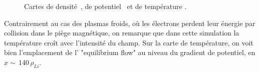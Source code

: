 \begin{refsection}
	\begin{figure}[!htbp]
    \centering
    \caption{Cartes de densité~, de
    potentiel~ et de température
   .}
    \label{2-CartesWithTeFiltre}
	\end{figure}
	
Contrairement au cas des plasmas froids, où les électrons perdent leur énergie
par collision dans le piège magnétique, on
remarque que dans cette simulation la température croît avec
l'intensité du champ. Sur la carte de température, on voit bien l'emplacement de
l' "equilibrium flow" au niveau du gradient de potentiel, en
$x\sim\,$140$\,\rho_{Li}$.
	

\end{refsection}
